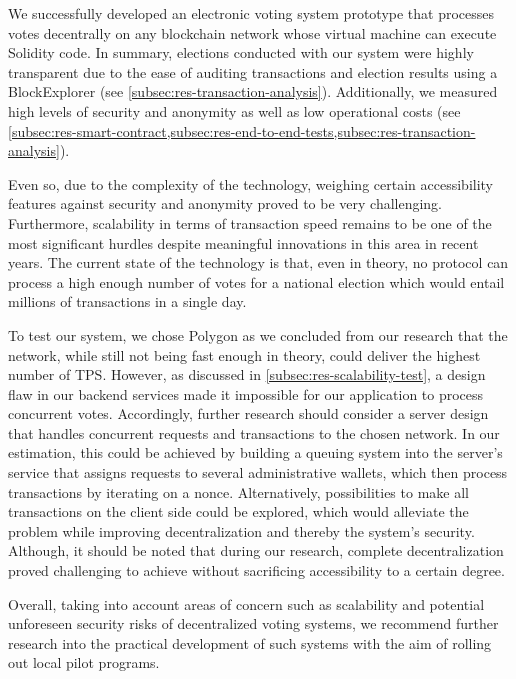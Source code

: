 We successfully developed an electronic voting system prototype that processes votes decentrally on any blockchain network whose virtual machine can execute Solidity code.
In summary, elections conducted with our system were highly transparent due to the ease of auditing transactions and election results using a \gls{BlockExplorer} (see \cref{subsec:res-transaction-analysis}).
Additionally, we measured high levels of security and anonymity as well as low operational costs (see \cref{subsec:res-smart-contract,subsec:res-end-to-end-tests,subsec:res-transaction-analysis}).

Even so, due to the complexity of the technology, weighing certain accessibility features against security and anonymity proved to be very challenging.
Furthermore, scalability in terms of transaction speed remains to be one of the most significant hurdles despite meaningful innovations in this area in recent years.
The current state of the technology is that, even in theory, no protocol can process a high enough number of votes for a national election which would entail millions of transactions in a single day.

To test our system, we chose Polygon as we concluded from our research that the network, while still not being fast enough in theory, could deliver the highest number of \gls{TPS}.
However, as discussed in \cref{subsec:res-scalability-test}, a design flaw in our backend services made it impossible for our application to process concurrent votes.
Accordingly, further research should consider a server design that handles concurrent requests and transactions to the chosen network.
In our estimation, this could be achieved by building a queuing system into the server’s service that assigns requests to several administrative wallets, which then process transactions by iterating on a nonce.
Alternatively, possibilities to make all transactions on the client side could be explored, which would alleviate the problem while improving decentralization and thereby the system’s security.
Although, it should be noted that during our research, complete decentralization proved challenging to achieve without sacrificing accessibility to a certain degree.

Overall, taking into account areas of concern such as scalability and potential unforeseen security risks of decentralized voting systems, we recommend further research into the practical development of such systems with the aim of rolling out local pilot programs.